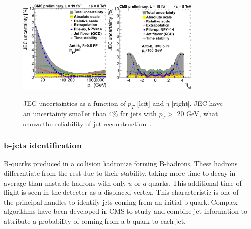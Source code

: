 \begin{figure}[!Hhtbp]
  \begin{center}
    \includegraphics[width=0.4\textwidth]{figs/JEC_pt.png}
    \includegraphics[width=0.4\textwidth]{figs/JEC_eta.png}
    \caption{JEC uncertainties as a function of $p_{T}$ [left] and $\eta$ [right]. JEC have an uncertainty smaller than 4\% for jets with $p_{T}>$ 20 GeV, what shows the reliability of jet reconstruction~\cite{Brochet:1956723}.}
    \label{fig:JEC}
  \end{center}
\end{figure}

\subsubsection{b-jets identification}
\label{sec:bid}

B-quarks produced in a collision hadronize forming B-hadrons. These hadrons differentiate from the rest due to their stability, taking more time to decay in average than unstable hadrons with only $u$ or $d$ quarks. This additional time of flight is seen in the detector as a displaced vertex. This characteristic is one of the principal handles to identify jets coming from an initial b-quark. Complex algorithms have been developed in CMS to study and combine jet information to attribute a probability of coming from a b-quark to each jet.  

